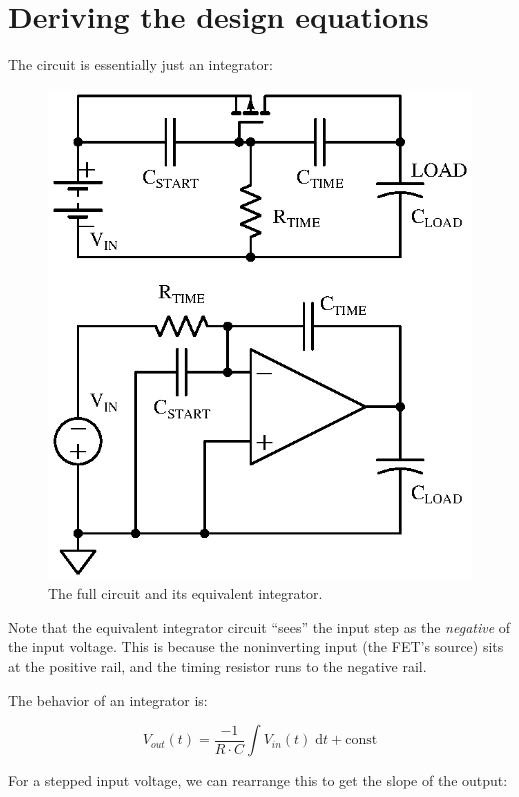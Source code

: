\documentclass[letterpaper,12pt]{article}
\begin{document}
\section{Deriving the design equations}
\label{sec:deriving}

The circuit is essentially just an integrator:

\begin{figure}[H]
\centering
\includegraphics{ckt_labeled}
\caption{The full circuit and its equivalent integrator.}
\end{figure}

Note that the equivalent integrator circuit ``sees'' the input step as the \emph{negative}
of the input voltage. This is because the noninverting input (the FET's source) sits at the
positive rail, and the timing resistor runs to the negative rail.

The behavior of an integrator is\cite[p. 230]{aoe}:

$$ V_{out}(t) = \frac{-1}{R\cdot C} \int V_{in}(t)\;\mathrm{d}t + \mathrm{const} $$

For a stepped input voltage, we can rearrange this to get the slope of the output:
\end{document}
